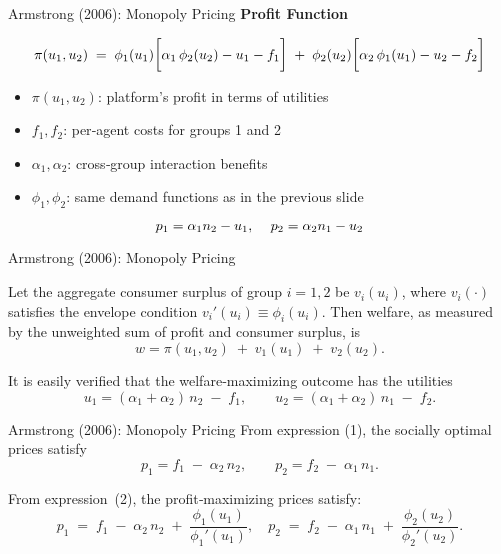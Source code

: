 \documentclass[aspectratio=169]{beamer}  %
\begin{document}
\begin{frame}{Armstrong (2006): Monopoly Pricing}
    \textbf{Profit Function}
    \vspace{1em}

    \begin{equation}
        \large
        \pi(u_{1}, u_{2}) \;=\; 
            \phi_{1}(u_{1})\Bigl[\alpha_{1}\,\phi_{2}(u_{2}) - u_{1} - f_{1}\Bigr]
            \;+\;
            \phi_{2}(u_{2})\Bigl[\alpha_{2}\,\phi_{1}(u_{1}) - u_{2} - f_{2}\Bigr]
    \end{equation}
    
    \begin{itemize}
      \item $\pi(u_{1},u_{2})$: platform’s profit in terms of utilities
      \item $f_{1},f_{2}$: per‐agent costs for groups 1 and 2
      \item $\alpha_{1}, \alpha_{2}$: cross‐group interaction benefits
      \item $\phi_{1}, \phi_{2}$: same demand functions as in the previous slide
    \end{itemize}
    \vspace{1em}
    \begin{equation*}
        \large
        p_1 = \alpha_1 n_2 - u_1, \quad p_2 = \alpha_2 n_1 - u_2
    \end{equation*}
\end{frame}

\begin{frame}{Armstrong (2006): Monopoly Pricing}
    \justifying

    Let the aggregate consumer surplus of group \(i = 1, 2\) be \(v_i(u_i)\), 
    where \(v_i(\cdot)\) satisfies the envelope condition 
    \( v_i'(u_i) \equiv \phi_i(u_i) \). Then welfare, as measured by the unweighted 
    sum of profit and consumer surplus, is
    \[
       w = \pi(u_1, u_2) \;+\; v_1(u_1) \;+\; v_2(u_2).
    \]
    
    It is easily verified that the welfare‐maximizing outcome has the utilities
    \[
       u_1 = (\alpha_1 + \alpha_2)\,n_2 \;-\; f_1,
       \qquad
       u_2 = (\alpha_1 + \alpha_2)\,n_1 \;-\; f_2.
    \]
    

\end{frame}

\begin{frame}{Armstrong (2006): Monopoly Pricing}
    \justifying
    From expression (1), the socially optimal prices satisfy
    \[
       p_1 = f_1 \;-\; \alpha_2\,n_2,
       \qquad
       p_2 = f_2 \;-\; \alpha_1\,n_1.
    \]

    From expression~(2), the profit‐maximizing prices satisfy:
    \[
      p_{1} 
      \;=\; f_{1} \;-\; \alpha_{2}\,n_{2}
              \;+\; \frac{\phi_{1}(u_{1})}{\phi_{1}'(u_{1})},
      \quad
      p_{2} 
      \;=\; f_{2} \;-\; \alpha_{1}\,n_{1}
              \;+\; \frac{\phi_{2}(u_{2})}{\phi_{2}'(u_{2})}.
    \]
\end{frame}
\end{document}
